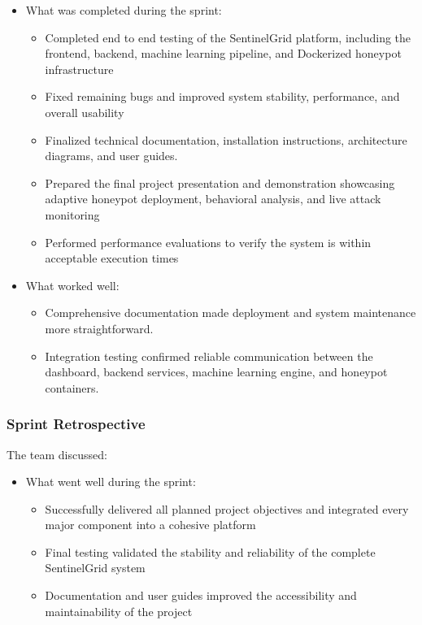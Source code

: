 \documentclass{article}
\begin{document}
\begin{itemize}
    \item What was completed during the sprint:
    \begin{itemize}
        \item Completed end to end testing of the SentinelGrid platform, including the frontend, backend, machine learning pipeline, and Dockerized honeypot infrastructure
        \item Fixed remaining bugs and improved system stability, performance, and overall usability
        \item Finalized technical documentation, installation instructions, architecture diagrams, and user guides.
        \item Prepared the final project presentation and demonstration showcasing adaptive honeypot deployment, behavioral analysis, and live attack monitoring
        \item Performed performance evaluations to verify the system is within acceptable execution times
    \end{itemize}
    \item What worked well:
     \begin{itemize}
        \item Comprehensive documentation made deployment and system maintenance more straightforward.
        \item Integration testing confirmed reliable communication between the dashboard, backend services, machine learning engine, and honeypot containers.
    \end{itemize}
\end{itemize}

\subsubsection{Sprint Retrospective}
The team discussed:
\begin{itemize}
    \item What went well during the sprint:
     \begin{itemize}
        \item Successfully delivered all planned project objectives and integrated every major component into a cohesive platform
        \item Final testing validated the stability and reliability of the complete SentinelGrid system 
        \item Documentation and user guides improved the accessibility and maintainability of the project
    \end{itemize}

\end{itemize}
\end{document}
